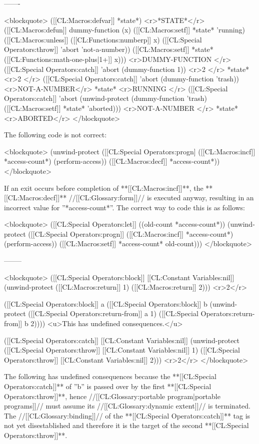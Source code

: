 -------

<blockquote>
([[CL:Macros:defvar]] *state*) <r>*STATE*</r>
([[CL:Macros:defun]] dummy-function (x) 
  ([[CL:Macros:setf]] *state* 'running) 
  ([[CL:Macros:unless]] ([[CL:Functions:numberp]] x) 
    ([[CL:Special Operators:throw]] 'abort 'not-a-number))
  ([[CL:Macros:setf]] *state* ([[CL:Functions:math-one-plus|1+]] x))) <r>DUMMY-FUNCTION </r>
([[CL:Special Operators:catch]] 'abort (dummy-function 1)) <r>2 </r>
*state* <r>2 </r>
([[CL:Special Operators:catch]] 'abort (dummy-function 'trash)) <r>NOT-A-NUMBER</r>
*state* <r>RUNNING </r>
([[CL:Special Operators:catch]] 'abort 
  (unwind-protect 
      (dummy-function 'trash) 
    ([[CL:Macros:setf]] *state* 'aborted))) <r>NOT-A-NUMBER </r>
*state* <r>ABORTED</r>
</blockquote>

The following code is not correct:

<blockquote>
(unwind-protect
    ([[CL:Special Operators:progn]
      ([[CL:Macros:incf]] *access-count*)
      (perform-access))
  ([[CL:Macros:decf]] *access-count*)) 
</blockquote>

If an exit occurs before completion of **[[CL:Macros:incf]]**, the **[[CL:Macros:decf]]** //[[CL:Glossary:form]]// is executed anyway, resulting in an incorrect value for ''*access-count*''. The correct way to code this is as follows:

<blockquote>
([[CL:Special Operators:let]] ((old-count *access-count*))
  (unwind-protect
    ([[CL:Special Operators:progn]]
      ([[CL:Macros:incf]] *access-count*)
      (perform-access)) 
    ([[CL:Macros:setf]] *access-count* old-count)))
</blockquote>

--------

<blockquote> 
([[CL:Special Operators:block]] [[CL:Constant Variables:nil]]
  (unwind-protect 
      ([[CL:Macros:return]] 1)
    ([[CL:Macros:return]] 2))) <r>2</r>

([[CL:Special Operators:block]] a 
  ([[CL:Special Operators:block]] b 
    (unwind-protect 
        ([[CL:Special Operators:return-from]] a 1) 
      ([[CL:Special Operators:return-from]] b 2))))
<u>This has undefined consequences.</u>

([[CL:Special Operators:catch]] [[CL:Constant Variables:nil]] 
  (unwind-protect 
      ([[CL:Special Operators:throw]] [[CL:Constant Variables:nil]] 1) 
    ([[CL:Special Operators:throw]] [[CL:Constant Variables:nil]] 2))) <r>2</r>
</blockquote>

The following has undefined consequences because the **[[CL:Special Operators:catch]]** of ''b'' is passed over by the first **[[CL:Special Operators:throw]]**, hence //[[CL:Glossary:portable program|portable programs]]// must assume its //[[CL:Glossary:dynamic extent]]// is terminated. The //[[CL:Glossary:binding]]// of the **[[CL:Special Operators:catch]]** tag is not yet disestablished and therefore it is the target of the second **[[CL:Special Operators:throw]]**. 

